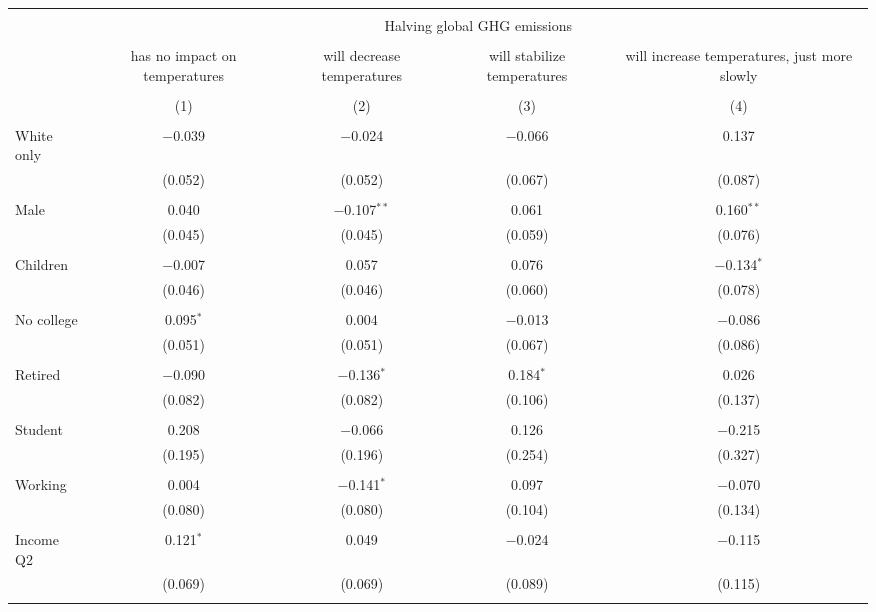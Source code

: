 
\begin{tabular}{@{\extracolsep{5pt}}lcccc} 
\\[-1.8ex]\hline 
\hline \\[-1.8ex] 
 & \multicolumn{4}{c}{Halving global GHG emissions} \\ 
\cline{2-5} 
\\[-1.8ex] & has no impact on temperatures & will decrease temperatures & will stabilize temperatures & will increase temperatures, just more slowly \\ 
\\[-1.8ex] & (1) & (2) & (3) & (4)\\ 
\hline \\[-1.8ex] 
 White only & $-$0.039 & $-$0.024 & $-$0.066 & 0.137 \\ 
  & (0.052) & (0.052) & (0.067) & (0.087) \\ 
  & & & & \\ 
 Male & 0.040 & $-$0.107$^{**}$ & 0.061 & 0.160$^{**}$ \\ 
  & (0.045) & (0.045) & (0.059) & (0.076) \\ 
  & & & & \\ 
 Children & $-$0.007 & 0.057 & 0.076 & $-$0.134$^{*}$ \\ 
  & (0.046) & (0.046) & (0.060) & (0.078) \\ 
  & & & & \\ 
 No college & 0.095$^{*}$ & 0.004 & $-$0.013 & $-$0.086 \\ 
  & (0.051) & (0.051) & (0.067) & (0.086) \\ 
  & & & & \\ 
 Retired & $-$0.090 & $-$0.136$^{*}$ & 0.184$^{*}$ & 0.026 \\ 
  & (0.082) & (0.082) & (0.106) & (0.137) \\ 
  & & & & \\ 
 Student & 0.208 & $-$0.066 & 0.126 & $-$0.215 \\ 
  & (0.195) & (0.196) & (0.254) & (0.327) \\ 
  & & & & \\ 
 Working & 0.004 & $-$0.141$^{*}$ & 0.097 & $-$0.070 \\ 
  & (0.080) & (0.080) & (0.104) & (0.134) \\ 
  & & & & \\ 
 Income Q2 & 0.121$^{*}$ & 0.049 & $-$0.024 & $-$0.115 \\ 
  & (0.069) & (0.069) & (0.089) & (0.115) \\ 
  & & & & \\ 

\end{tabular}
